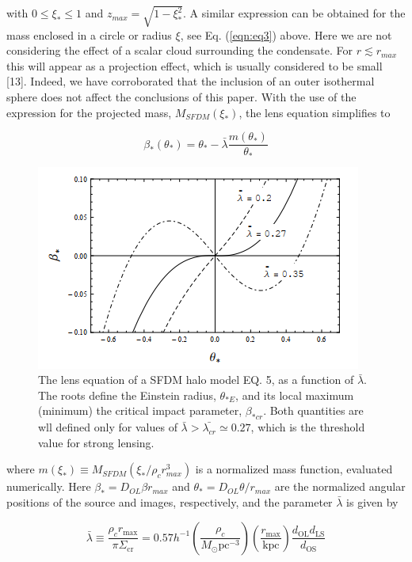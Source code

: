 \documentclass[9.5pt, twocolumn]{article}
\begin{document}
with $0\leq\xi_{*}\leq1$ and $z_{max}=\sqrt{1-\xi_{*}^2}$. A similar expression can be obtained for the mass enclosed in a circle or radius $\xi$, see Eq. (\ref{eqn:eq3}) above. Here we are not considering the effect of a scalar cloud surrounding the condensate. For $r\lesssim r_{max}$ this will appear as a projection effect, which is usually considered to be small [13]. Indeed, we have corroborated that the inclusion of an outer isothermal sphere does not affect the conclusions of this
paper. With the use of  the expression for the projected mass, $M_{SFDM}(\xi_{*})$, the lens equation simplifies to

\begin{equation}
\beta_{*}\left(\theta_{*}\right)=\theta_{*}-\bar{\lambda} \frac{m\left(\theta_{*}\right)}{\theta_{*}}
\label{eqn:eq5}
\end{equation}

\begin{figure}
    \centering
    \includegraphics[scale=0.8]{grafica1.png}
    \caption{The lens equation of a SFDM halo model EQ. 5, as a function of $\bar{\lambda}$. The roots define the Einstein radius, $\theta_{*E}$, and its local maximum (minimum) the critical impact parameter, $\beta_{*cr}$. Both quantities are wll defined only for values of $\bar{\lambda}>\bar{\lambda_{cr}}\simeq 0.27$, which is the threshold value for strong lensing.}
    \label{fig:Grafica1}
\end{figure}
    


where $m(\xi_*)\equiv M_{SFDM}(\xi_*/\rho_cr_{max}^3)$ is a normalized mass
function, evaluated numerically. Here $\beta_{*}=D_{OL}\beta r_{max}$ and $\theta_{*}=D_{OL}\theta/r_{max}$ are the normalized angular positions
of the source and images, respectively, and the parameter $\bar{\lambda}$ is given by

\begin{equation}
\bar{\lambda} \equiv \frac{\rho_{c} r_{\max }}{\pi \Sigma_{\mathrm{cr}}}=0.57 h^{-1}\left(\frac{\rho_{c}}{M_{\odot} \mathrm{pc}^{-3}}\right)\left(\frac{r_{\mathrm{max}}}{\mathrm{kpc}}\right) \frac{d_{\mathrm{OL}} d_{\mathrm{LS}}}{d_{\mathrm{OS}}}
\label{eqn:eq6}
\end{equation}
\end{document}
